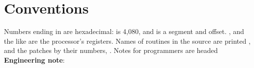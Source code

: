 \section{Conventions}

Numbers ending in  are hexadecimal:  is 4,080, and
 is a segment and offset. ,  and the
like are the processor's registers. Names of routines in the source are
printed , and the patches by their numbers,
. Notes for programmers are headed \textbf{Engineering note}:


\mwnewpart
\renewcommand\runningtitle{Contents}
\renewcommand\contentsname{Contents}
\tableofcontents
